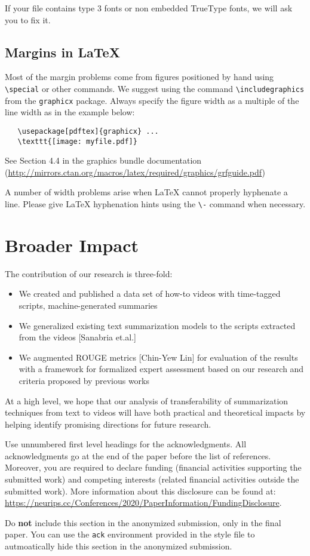 \documentclass{article}
\begin{document}
If your file contains type 3 fonts or non embedded TrueType fonts, we will ask
you to fix it.

\subsection{Margins in \LaTeX{}}

Most of the margin problems come from figures positioned by hand using
\verb+\special+ or other commands. We suggest using the command
\verb+\includegraphics+ from the \verb+graphicx+ package. Always specify the
figure width as a multiple of the line width as in the example below:
\begin{verbatim}
   \usepackage[pdftex]{graphicx} ...
   \texttt{[image: myfile.pdf]}
\end{verbatim}
See Section 4.4 in the graphics bundle documentation
(\url{http://mirrors.ctan.org/macros/latex/required/graphics/grfguide.pdf})

A number of width problems arise when \LaTeX{} cannot properly hyphenate a
line. Please give LaTeX hyphenation hints using the \verb+\-+ command when
necessary.


\section*{Broader Impact}

The contribution of our research is three-fold:
\begin{itemize}

\item We created and published a data set of how-to videos with time-tagged scripts, machine-generated summaries
\item We generalized  existing text summarization models to the scripts extracted from the videos [Sanabria et.al.]
\item We augmented ROUGE metrics [Chin-Yew Lin] for evaluation of the results with a framework for formalized expert assessment based on our research and criteria proposed by previous works 
\end{itemize}

At a high level, we hope that our analysis of transferability of summarization techniques from text to videos will have both practical and theoretical impacts by helping identify promising directions for future research.


\begin{ack}
Use unnumbered first level headings for the acknowledgments. All acknowledgments
go at the end of the paper before the list of references. Moreover, you are required to declare 
funding (financial activities supporting the submitted work) and competing interests (related financial activities outside the submitted work). 
More information about this disclosure can be found at: \url{https://neurips.cc/Conferences/2020/PaperInformation/FundingDisclosure}.


Do {\bf not} include this section in the anonymized submission, only in the final paper. You can use the \texttt{ack} environment provided in the style file to autmoatically hide this section in the anonymized submission.
\end{ack}
\end{document}

